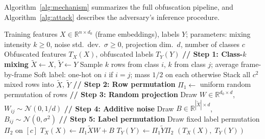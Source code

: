 \documentclass[letterpaper]{article} %
\begin{document}

Algorithm~\ref{alg:mechanism} summarizes the full obfuscation pipeline, and Algorithm~\ref{alg:attack} describes the adversary's inference procedure.

\begin{algorithm}[t]
\caption{Obfuscation Mechanism (Data Owner)}
\label{alg:mechanism}
\begin{algorithmic}[1]
\REQUIRE Training features $X \in \mathbb{R}^{n \times d_0}$ (frame embeddings), labels $Y$; parameters: mixing intensity $k \ge 0$, noise std.\ dev.\ $\sigma \ge 0$, projection dim.\ $d$, number of classes $c$
\ENSURE Obfuscated features $T_X(X)$, obfuscated labels $T_Y(Y)$
\STATE \textbf{// Step 1: Class-$k$ mixing}
  \STATE $\tilde{X} \leftarrow X$, $\tilde{Y} \leftarrow Y$
\ELSE
    \STATE Sample $k$ rows from class $i$, $k$ from class $j$; average frame-by-frame
    \STATE Soft label: one-hot on $i$ if $i{=}j$; mass $1/2$ on each otherwise
  \ENDFOR
  \STATE Stack all $c^2$ mixed rows into $\tilde{X}$, $\tilde{Y}$
\ENDIF
\STATE \textbf{// Step 2: Row permutation}
\STATE $\Pi_1 \leftarrow$ uniform random permutation of rows
\STATE \textbf{// Step 3: Random projection}
\STATE Draw $W \in \mathbb{R}^{d_0 \times d}$, $W_{ij} \sim \mathcal{N}(0, 1/d)$
\STATE \textbf{// Step 4: Additive noise}
\STATE Draw $B \in \mathbb{R}^{|\tilde{X}| \times d}$, $B_{ij} \sim \mathcal{N}(0, \sigma^2)$
\STATE \textbf{// Step 5: Label permutation}
\STATE Draw fixed label permutation $\Pi_2$ on $[c]$
\STATE $T_X(X) \leftarrow \Pi_1 \tilde{X} W + B$
\STATE $T_Y(Y) \leftarrow \Pi_1 \tilde{Y} \Pi_2$
\RETURN $(T_X(X),\; T_Y(Y))$
\end{algorithmic}
\end{algorithm}
\end{document}

